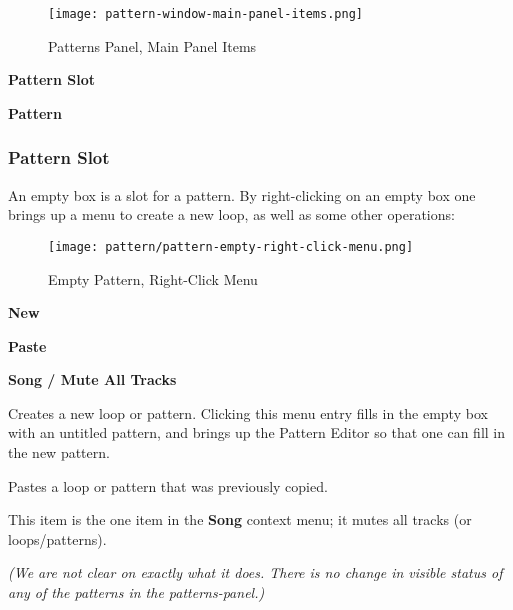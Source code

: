 \begin{figure}[H]
   \centering 
   \texttt{[image: pattern-window-main-panel-items.png]}
   \caption{Patterns Panel, Main Panel Items}
   \label{fig:pattern_window_main_panel_items}
\end{figure}

   \begin{enumber}
      \item \textbf{Pattern Slot}
      \item \textbf{Pattern}
   \end{enumber}

\subsubsection{Pattern Slot}
\label{subsubsec:seq24_patterns_pattern_slot}

   An empty box is a slot for a pattern.
   By right-clicking on an empty box one brings up a menu to create
   a new loop, as well as some other operations:

\begin{figure}[H]
   \centering 
   \texttt{[image: pattern/pattern-empty-right-click-menu.png]}
   \caption{Empty Pattern, Right-Click Menu}
   \label{fig:pattern_window_empty_right_click}
\end{figure}

   \begin{enumber}
      \item \textbf{New}
      \item \textbf{Paste}
      \item \textbf{Song / Mute All Tracks}
   \end{enumber}

   \setcounter{ItemCounter}{0}      %

   Creates a new loop or pattern.
   Clicking this menu entry fills in the empty box with an untitled
   pattern, and brings up the Pattern Editor
   so that one can fill in the new pattern.

   Pastes a loop or pattern that was previously copied.

   This item is the one item in the \textbf{Song} context menu;
   it mutes all tracks (or loops/patterns).
   
   \textsl{(We are not clear
   on exactly what it does.  There is no change in visible
   status of any of the patterns in the patterns-panel.)}

